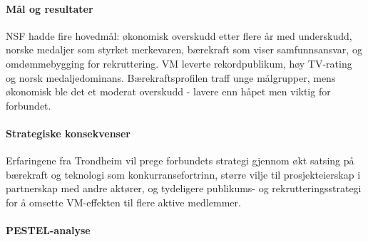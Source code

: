 \paragraph{Mål og resultater}
NSF hadde fire hovedmål: økonomisk overskudd etter flere år med underskudd\cite{Adresseavisen}, norske medaljer som styrket merkevaren, bærekraft som viser samfunnsansvar\cite{TrondheimKommuneVM}, og omdømmebygging for rekruttering\cite{OsloVM}. VM leverte rekordpublikum, høy TV-rating og norsk medaljedominans. Bærekraftsprofilen traff unge målgrupper, mens økonomisk ble det et moderat overskudd - lavere enn håpet men viktig for forbundet\cite{Trondheim2025Portal,Adresseavisen}.

\paragraph{Strategiske konsekvenser}
Erfaringene fra Trondheim vil prege forbundets strategi gjennom økt satsing på bærekraft og teknologi som konkurransefortrinn, større vilje til prosjekteierskap i partnerskap med andre aktører, og tydeligere publikums- og rekrutteringsstrategi for å omsette VM-effekten til flere aktive medlemmer.

\paragraph{PESTEL-analyse}

